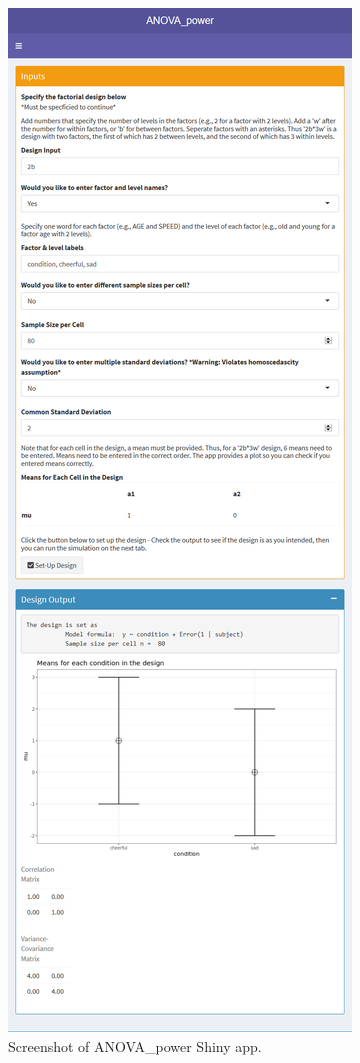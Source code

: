 \documentclass[
  english,
  ,jou,floatsintext]{apa6}
\begin{document}
\begin{figure}
\centering
\includegraphics{screenshots/anova_power.png}
\caption{Screenshot of ANOVA\_power Shiny app.}
\end{figure}
\end{document}
